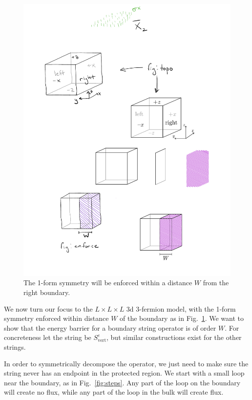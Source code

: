 \documentclass[twocolumn, longbibliography]{revtex4-2}
\renewcommand{\vert}{\text{vert}}
\begin{document}
\begin{figure}
\centering
\includegraphics{enforce}
\caption{The 1-form symmetry will be enforced within a distance $W$ from the right boundary.}
\label{fig:enforce}
\end{figure}
	
We now turn our focus to the $L\times L\times L$ 3d 3-fermion model, with the 1-form symmetry enforced within distance $W$ of the boundary as in Fig.~\ref{fig:enforce}. We want to show that the energy barrier for a boundary string operator is of order $W$.
For concreteness let the string be $S^e_\vert$, but similar constructions exist for the other strings.

In order to symmetrically decompose the operator, we just need to make sure the string never has an endpoint in the protected region. We start with a small loop near the boundary, as in Fig.~\ref{fig:steps}. Any part of the loop on the boundary will create no flux, while any part of the loop in the bulk will create flux.
\end{document}
